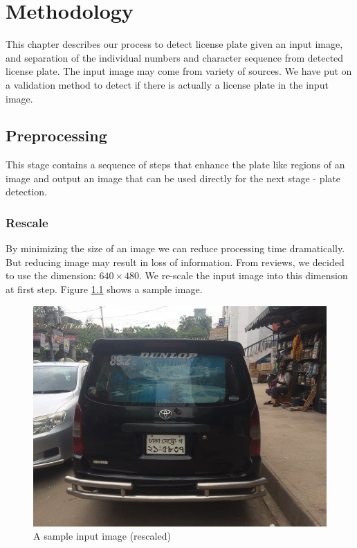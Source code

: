 \documentclass{standalone}
\begin{document}
\chapter{Methodology}
This chapter describes our process to detect license plate given an input image, and separation of the individual numbers and character sequence from detected license plate. The input image may come from variety of sources. We have put on a validation method to detect if there is actually a license plate in the input image.










\section{Preprocessing}
This stage contains a sequence of steps that enhance the plate like regions of an image and output an image that can be used directly for the next stage - plate detection.

\subsection{Rescale}
By minimizing the size of an image we can reduce processing time dramatically. But reducing image may result in loss of information. From reviews, we decided to use the dimension: $640 \times 480$. We re-scale the input image into this dimension at first step. Figure \ref{fig:RescaledSample} shows a sample image.
\begin{figure} 
	\centering
	\includegraphics[width=.8\linewidth]{./img/sample/stage0.jpg}
	\caption{A sample input image (rescaled)}
	\label{fig:RescaledSample}
\end{figure}
\end{document}
